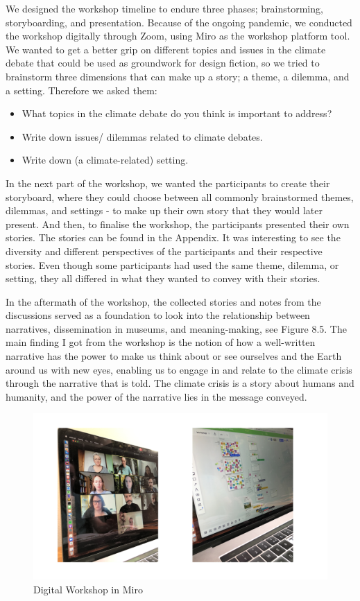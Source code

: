 We designed the workshop timeline to endure three phases; brainstorming, storyboarding, and presentation. Because of the ongoing pandemic, we conducted the workshop digitally through Zoom, using Miro as the workshop platform tool. We wanted to get a better grip on different topics and issues in the climate debate that could be used as groundwork for design fiction, so we tried to brainstorm three dimensions that can make up a story; a theme, a dilemma, and a setting. Therefore we asked them:

\begin{itemize}
    \item What topics in the climate debate do you think is important to address?
    \item Write down issues/ dilemmas related to climate debates.
    \item Write down (a climate-related) setting.
\end{itemize}

In the next part of the workshop, we wanted the participants to create their storyboard, where they could choose between all commonly brainstormed themes, dilemmas, and settings - to make up their own story that they would later present. And then, to finalise the workshop, the participants presented their own stories. The stories can be found in the Appendix. It was interesting to see the diversity and different perspectives of the participants and their respective stories. Even though some participants had used the same theme, dilemma, or setting, they all differed in what they wanted to convey with their stories. 

In the aftermath of the workshop, the collected stories and notes from the discussions served as a foundation to look into the relationship between narratives, dissemination in museums, and meaning-making, see Figure 8.5. The main finding I got from the workshop is the notion of how a well-written narrative has the power to make us think about or see ourselves and the Earth around us with new eyes, enabling us to engage in and relate to the climate crisis through the narrative that is told. The climate crisis is a story about humans and humanity, and the power of the narrative lies in the message conveyed.

\begin{figure}[H]
\includegraphics[width=13cm]{pictures/narrative_workshop.png}
\caption{Digital Workshop in Miro}
\centering 
\end{figure}

